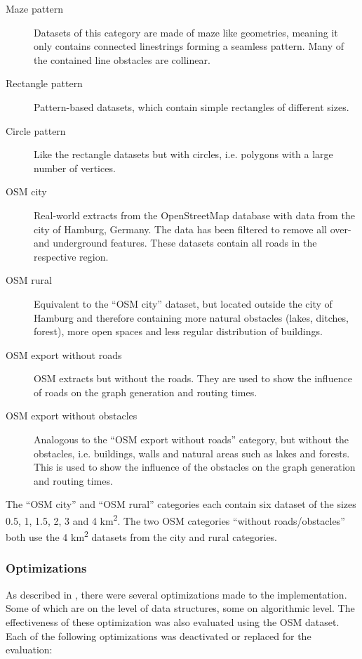 			\begin{description}
				\item[Maze pattern] Datasets of this category are made of maze like geometries, meaning it only contains connected linestrings forming a seamless pattern. Many of the contained line obstacles are collinear.
				\item[Rectangle pattern] Pattern-based datasets, which contain simple rectangles of different sizes.
				\item[Circle pattern] Like the rectangle datasets but with circles, i.e. polygons with a large number of vertices.
				\item[OSM city] Real-world extracts from the OpenStreetMap database with data from the city of Hamburg, Germany. The data has been filtered to remove all over- and underground features. These datasets contain all roads in the respective region.
				\item[OSM rural] Equivalent to the \enquote{OSM city} dataset, but located outside the city of Hamburg and therefore containing more natural obstacles (lakes, ditches, forest), more open spaces and less regular distribution of buildings.
				\item[OSM export without roads] OSM extracts but without the roads. They are used to show the influence of roads on the graph generation and routing times.
				\item[OSM export without obstacles] Analogous to the \enquote{OSM export without roads} category, but without the obstacles, i.e. buildings, walls and natural areas such as lakes and forests. This is used to show the influence of the obstacles on the graph generation and routing times.
			\end{description}
			The \enquote{OSM city} and \enquote{OSM rural} categories each contain six dataset of the sizes 0.5, 1, 1.5, 2, 3 and 4 km\textsuperscript{2}.
			The two OSM categories \enquote{without roads/obstacles} both use the 4 km\textsuperscript{2} datasets from the city and rural categories.
			
			
		
		\subsubsection{Optimizations}
		
			As described in , there were several optimizations made to the implementation.
			Some of which are on the level of data structures, some on algorithmic level.
			The effectiveness of these optimization was also evaluated using the OSM dataset.
			Each of the following optimizations was deactivated or replaced for the evaluation:

